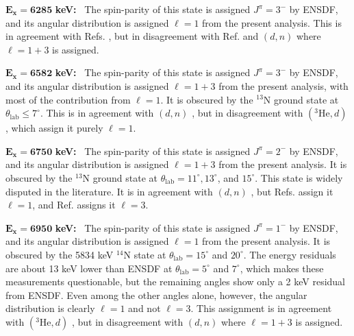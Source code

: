 \emph{$\mathbf{E_{x} = 6285}$} \textbf{keV:} \, 
The spin-parity of this state is assigned $J^{\pi} = 3^{-}$ by ENSDF, and its angular distribution is assigned $\ell=1$ from the present analysis. This is in agreement with Refs. \cite{Erskine1966,Forster1970,Cage1971}, but in disagreement with Ref. \cite{Seth1967} and $(d,n)$ \cite{Fuchs1969} where $\ell=1+3$ is assigned.

\emph{$\mathbf{E_{x} = 6582}$} \textbf{keV:} \, 
The spin-parity of this state is assigned $J^{\pi} = 3^{-}$ by ENSDF, and its angular distribution is assigned $\ell=1+3$ from the present analysis, with most of the contribution from $\ell=1$. It is obscured by the $^{13}$N ground state at $\theta_{\mathrm{lab}} \leq 7^{\circ}$. This is in agreement with $(d,n)$ \cite{Fuchs1969}, but in disagreement with $(^{3}\mathrm{He},d)$ \cite{Erskine1966,Seth1967,Forster1970,Cage1971}, which assign it purely $\ell=1$.

\emph{$\mathbf{E_{x} = 6750}$} \textbf{keV:} \, 
The spin-parity of this state is assigned $J^{\pi} = 2^{-}$ by ENSDF, and its angular distribution is assigned $\ell=1+3$ from the present analysis. It is obscured by the $^{13}$N ground state at $\theta_{\mathrm{lab}} = 11^{\circ}, 13^{\circ}$, and $15^{\circ}$. This state is widely disputed in the literature. It is in agreement with $(d,n)$ \cite{Fuchs1969}, but Refs. \cite{Erskine1966,Seth1967,Forster1970} assign it $\ell=1$, and Ref. \cite{Cage1971} assigns it $\ell=3$.

\emph{$\mathbf{E_{x} = 6950}$} \textbf{keV:} \, 
The spin-parity of this state is assigned $J^{\pi} = 1^{-}$ by ENSDF, and its angular distribution is assigned $\ell=1$ from the present analysis. It is obscured by the 5834 keV $^{14}$N state at $\theta_{\mathrm{lab}} = 15^{\circ}$ and $20^{\circ}$. The energy residuals are about 13 keV lower than ENSDF at $\theta_{\mathrm{lab}} = 5^{\circ}$ and $7^{\circ}$, which makes these measurements questionable, but the remaining angles show only a 2 keV residual from ENSDF. Even among the other angles alone, however, the angular distribution is clearly $\ell=1$ and not $\ell=3$. This assignment is in agreement with $(^{3}\mathrm{He},d)$ \cite{Erskine1966,Seth1967,Forster1970,Cage1971}, but in disagreement with $(d,n)$ \cite{Fuchs1969} where $\ell=1+3$ is assigned.

